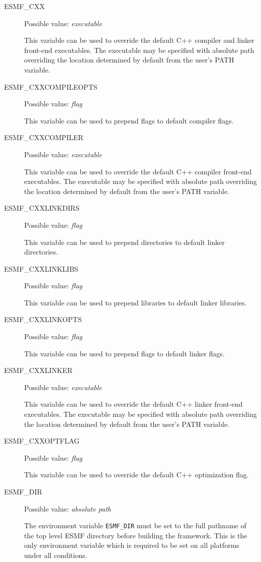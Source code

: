 \begin{description}
\item[ESMF\_CXX]
Possible value: {\em executable}

This variable can be used to override the default C++ compiler and linker
front-end executables. The executable may be specified with absolute path
overriding the location determined by default from the user's PATH variable.

\item[ESMF\_CXXCOMPILEOPTS]
Possible value: {\em flag}

This variable can be used to prepend flags to default compiler flags.

\item[ESMF\_CXXCOMPILER]
Possible value: {\em executable}

This variable can be used to override the default C++ compiler
front-end executables. The executable may be specified with absolute path
overriding the location determined by default from the user's PATH variable.

\item[ESMF\_CXXLINKDIRS]
Possible value: {\em flag}

This variable can be used to prepend directories to default linker directories.

\item[ESMF\_CXXLINKLIBS]
Possible value: {\em flag}

This variable can be used to prepend libraries to default linker libraries.

\item[ESMF\_CXXLINKOPTS]
Possible value: {\em flag}

This variable can be used to prepend flags to default linker flags.

\item[ESMF\_CXXLINKER]
Possible value: {\em executable}

This variable can be used to override the default C++ linker
front-end executables. The executable may be specified with absolute path
overriding the location determined by default from the user's PATH variable.

\item[ESMF\_CXXOPTFLAG]
Possible value: {\em flag}

This variable can be used to override the default C++ optimization flag.

\item[ESMF\_DIR]
Possible value: {\em absolute path}

The environment variable {\tt ESMF\_DIR} must be set to the full pathname 
of the top level ESMF directory before building the framework. This is the 
only environment variable which is required to be set on all platforms under 
all conditions.


\end{description}
